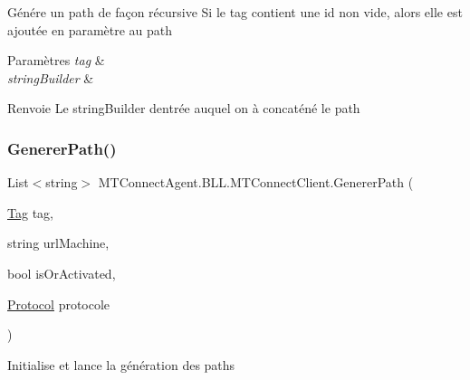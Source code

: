 Génére un path de façon récursive Si le tag contient une id non vide, alors elle est ajoutée en paramètre au path 


\begin{DoxyParams}{Paramètres}
{\em tag} & \\
\hline
{\em string\+Builder} & \\
\hline
\end{DoxyParams}
\begin{DoxyReturn}{Renvoie}
Le string\+Builder d\textquotesingle{}entrée auquel on à concaténé le path
\end{DoxyReturn}
\mbox{\label{class_m_t_connect_agent_1_1_b_l_l_1_1_m_t_connect_client_a00fd074e11835791343b6d0c9c74b5f8}} 
\subsubsection{\texorpdfstring{Generer\+Path()}{GenererPath()}\hspace{0.1cm}{\footnotesize\ttfamily [2/2]}}
{\footnotesize\ttfamily List$<$string$>$ M\+T\+Connect\+Agent.\+B\+L\+L.\+M\+T\+Connect\+Client.\+Generer\+Path (\begin{DoxyParamCaption}\item[{\mbox{\hyperlink{class_m_t_connect_agent_1_1_model_1_1_tag}{Tag}}}]{tag,  }\item[{string}]{url\+Machine,  }\item[{bool}]{is\+Or\+Activated,  }\item[{\mbox{\hyperlink{class_m_t_connect_agent_1_1_b_l_l_1_1_m_t_connect_client_a2f390f74a0ad3ee5147e9438ceed6474}{Protocol}}}]{protocole }\end{DoxyParamCaption})\hspace{0.3cm}{\ttfamily [inline]}}



Initialise et lance la génération des paths 


